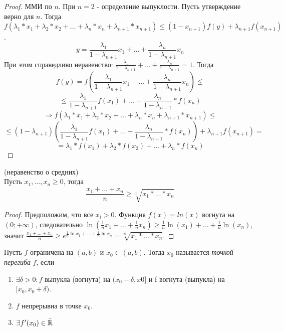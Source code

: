 \begin{proof}
    ММИ по $n$. При $n = 2$ - определение выпуклости.
    Пусть утверждение верно для $n$.
    Тогда $f(\lambda_1*x_1 + \lambda_2*x_2 + \dots + \lambda_n*x_n + \lambda_{n+1}*x_{n+1}) \leq (1-x_{n+1})f(y) + \lambda_{n+1}f(x_{n+1})$.
    \[y = \frac{\lambda_1}{1 - \lambda_{n+1}}x_1 + \dots + \frac{\lambda_n}{1 - \lambda_{n+1}}x_n\]
    При этом справедливо неравенство: $\frac{\lambda_1}{1 - \lambda_{n+1}} + \dots + \frac{\lambda_n}{1 - \lambda_{n+1}} = 1$. Тогда
    \[f(y) = f(\frac{\lambda_1}{1 - \lambda_{n+1}}x_1 + \dots + \frac{\lambda_n}{1 - \lambda_{n+1}}x_n) \leq \]
    \[\leq \frac{\lambda_1}{1 - \lambda_{n+1}}f(x_1) + \dots + \frac{\lambda_n}{1 - \lambda_{n+1}}*f(x_n)\]
    \[\Rightarrow f(\lambda_1*x_1 + \lambda_2*x_2 + \dots + \lambda_n*x_n + \lambda_{n+1}*x_{n+1}) \leq\]
    \[\leq (1-\lambda_{n+1})(\frac{\lambda_1}{1 - \lambda_{n+1}}f(x_1) + \dots + \frac{\lambda_n}{1 - \lambda_{n+1}}*f(x_n)) + \lambda_{n+1}f(x_{n+1}) =\]
    \[= \lambda_1*f(x_1) + \lambda_2*f(x_2) + \dots + \lambda_n*f(x_n)\]
\end{proof}

\begin{example} (неравенство о средних)\\
    Пусть $x_1, \dots, x_n \geq 0$, тогда
    \[\frac{x_1 + \dots + x_n}{n} \geq \sqrt[n]{x_1 * \dots * x_n}\]
\end{example}

\begin{proof}
    Предположим, что все $x_i > 0$.
    Функция $f(x) = ln(x)$ вогнута на $(0; +\infty)$, следовательно
    $\ln(\frac{1}{n}x_1 + \dots + \frac{1}{n}x_n) \geq \frac{1}{n}\ln(x_1) + \dots + \frac{1}{n}\ln(x_n)$,
    значит $\frac{x_1 + \dots + x_n}{n} \geq e^{\frac{1}{n}\ln{x_1} + \dots + \frac{1}{n}\ln{x_n}} = \sqrt[n]{x_1 * \dots * x_n}$.
\end{proof}

\begin{definition}
    Пусть $f$ ограничена на $(a, b)$ и $x_0 \in (a, b)$. Тогда $x_0$ называется \textit{точкой перегиба} $f$, если
    \begin{enumerate}
        \item $\exists \delta > 0 : f$ выпукла (вогнута) на $(x_0 - \delta, x0]$ и f вогнута (выпукла) на $[x_0, x_0 + \delta)$.
        \item $f$ непрерывна в точке $x_0$.
        \item $\exists f'(x_0) \in \bar{\mathbb{R}}$
    \end{enumerate}
\end{definition}

